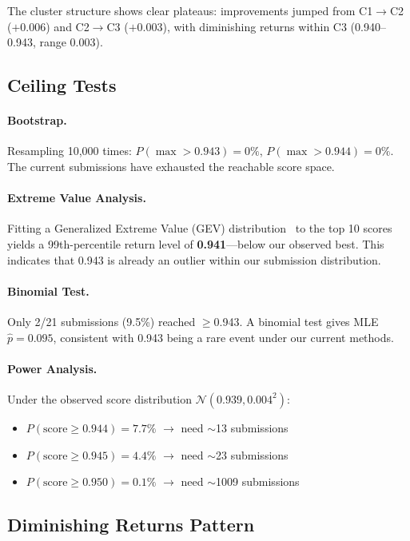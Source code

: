 \documentclass[a4paper,11pt]{article}
\begin{document}
The cluster structure shows clear plateaus: improvements jumped from C1$\to$C2 ($+$0.006) and C2$\to$C3 ($+$0.003),
with diminishing returns within C3 (0.940--0.943, range 0.003).

\subsection{Ceiling Tests}

\paragraph{Bootstrap.} Resampling 10,000 times: $P(\max > 0.943) = 0\%$, $P(\max > 0.944) = 0\%$.
The current submissions have exhausted the reachable score space.

\paragraph{Extreme Value Analysis.} Fitting a Generalized Extreme Value (GEV) distribution~\citep{coles2001introduction}
to the top 10 scores yields a 99th-percentile return level of \textbf{0.941}---below our observed best.
This indicates that 0.943 is already an outlier within our submission distribution.

\paragraph{Binomial Test.} Only 2/21 submissions (9.5\%) reached $\geq$0.943.
A binomial test gives MLE $\hat{p} = 0.095$, consistent with 0.943 being a rare event under our current methods.

\paragraph{Power Analysis.} Under the observed score distribution $\mathcal{N}(0.939, 0.004^2)$:
\begin{itemize}
\item $P(\text{score} \geq 0.944) = 7.7\%$ $\to$ need $\sim$13 submissions
\item $P(\text{score} \geq 0.945) = 4.4\%$ $\to$ need $\sim$23 submissions
\item $P(\text{score} \geq 0.950) = 0.1\%$ $\to$ need $\sim$1009 submissions
\end{itemize}

\subsection{Diminishing Returns Pattern}
\end{document}
